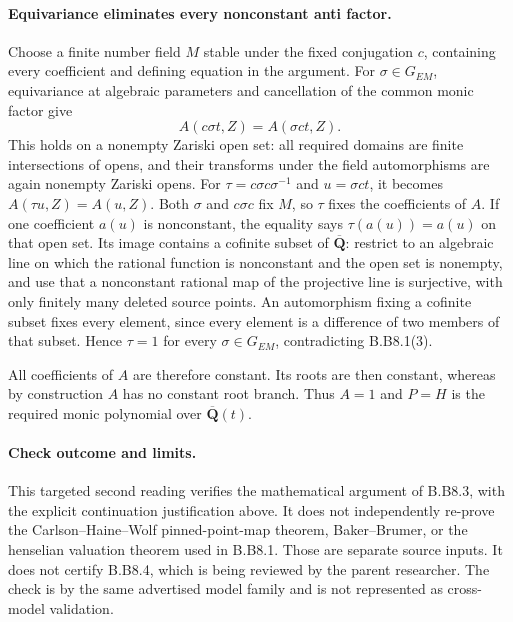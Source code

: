 \paragraph{Equivariance eliminates every nonconstant anti factor.}
Choose a finite number field $M$ stable under the fixed conjugation
$c$, containing every coefficient and defining equation in the
argument. For $\sigma\in G_{EM}$, equivariance at algebraic
parameters and cancellation of the common monic factor give
\[
 A(c\sigma t,Z)=A(\sigma c t,Z).
\]
This holds on a nonempty Zariski open set: all required domains
are finite intersections of opens, and their transforms under
the field automorphisms are again nonempty Zariski opens. For
$\tau=c\sigma c\sigma^{-1}$ and $u=\sigma ct$, it becomes
$A(\tau u,Z)=A(u,Z)$. Both $\sigma$ and $c\sigma c$ fix $M$,
so $\tau$ fixes the coefficients of $A$. If one coefficient
$a(u)$ is nonconstant, the equality says
$\tau(a(u))=a(u)$ on that open set. Its image contains a cofinite
subset of $\overline{\mathbf Q}$: restrict to an algebraic line
on which the rational function is nonconstant and the open set
is nonempty, and use that a nonconstant rational map of the
projective line is surjective, with only finitely many deleted
source points. An automorphism fixing a cofinite subset fixes
every element, since every element is a difference of two
members of that subset. Hence $\tau=1$ for every
$\sigma\in G_{EM}$, contradicting B.B8.1(3).

All coefficients of $A$ are therefore constant. Its roots are
then constant, whereas by construction $A$ has no constant root
branch. Thus $A=1$ and $P=H$ is the required monic polynomial
over $\overline{\mathbf Q}(t)$.

\paragraph{Check outcome and limits.}
This targeted second reading verifies the mathematical argument
of B.B8.3, with the explicit continuation justification above.
It does not independently re-prove the Carlson--Haine--Wolf
pinned-point-map theorem, Baker--Brumer, or the henselian
valuation theorem used in B.B8.1. Those are separate source
inputs. It does not certify B.B8.4, which is being reviewed by
the parent researcher. The check is by the same advertised model
family and is not represented as cross-model validation.
